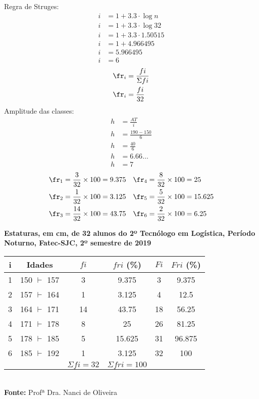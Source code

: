 Regra de Struges:
\begin{align*}
	i & = 1 + 3.3 \cdot \log{n}  \\
	i & = 1 + 3.3 \cdot \log{32} \\
	i & = 1 + 3.3 \cdot 1.50515  \\
	i & = 1 + 4.966495           \\
	i & = 5.966495               \\
	i & = 6
\end{align*}
\begin{align*}
	\fr_i & = \frac{fi}{\Sigma fi} \\
	\fr_i & = \frac{fi}{32}
\end{align*}
Amplitude das classes:
\begin{align*}
	h & = \frac{AT}{i}      \\
	h & = \frac{190-150}{6} \\
	h & = \frac{40}{6}      \\
	h & = 6.66\dots         \\
	h & = 7
\end{align*}
\begin{align*}
	 & \fr_1 = \frac{3}{32} \times 100 = 9.375  &  & \fr_4 = \frac{8}{32} \times 100 = 25      \\
	 & \fr_2 = \frac{1}{32} \times 100 = 3.125  &  & \fr_5 = \frac{5}{32} \times 100 =  15.625 \\
	 & \fr_3 = \frac{14}{32} \times 100 = 43.75 &  & \fr_6 = \frac{2}{32} \times 100 = 6.25
\end{align*}
\newpage
\begin{center}
	\textbf{Estaturas, em cm, de 32 alunos do 2º Tecnólogo em Logística, Período Noturno, Fatec-SJC, 2º semestre de 2019}\\
	\begin{tabular}{c | c | c | c | c | c}
		\hline
		i & Idades           & $fi$              & $fri$ (\%)           & $Fi$ & $Fri$ (\%) \\
		\hline
		1 & 150 $\vdash$ 157 & 3                 & 9.375                & 3    & 9.375      \\
		\hline
		2 & 157 $\vdash$ 164 & 1                 & 3.125                & 4    & 12.5       \\
		\hline
		3 & 164 $\vdash$ 171 & 14                & 43.75                & 18   & 56.25      \\
		\hline
		4 & 171 $\vdash$ 178 & 8                 & 25                   & 26   & 81.25      \\
		\hline
		5 & 178 $\vdash$ 185 & 5                 & 15.625               & 31   & 96.875     \\
		\hline
		6 & 185 $\vdash$ 192 & 1                 & 3.125                & 32   & 100        \\
		\hline
		  &                  & $\Sigma fi = 32 $ & $ \Sigma fri = 100 $ &      &
	\end{tabular}\\
	\textbf{Fonte:} Profª Dra. Nanci de Oliveira
\end{center}
